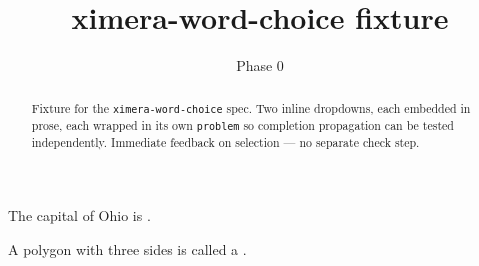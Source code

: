 \documentclass{ximera}
\title{ximera-word-choice fixture}
\author{Phase 0}
\begin{document}
\begin{abstract}
Fixture for the \texttt{ximera-word-choice} spec. Two inline dropdowns, each embedded in prose, each wrapped in its own \texttt{problem} so completion propagation can be tested independently. Immediate feedback on selection --- no separate check step.
\end{abstract}

\maketitle

\begin{problem}
  The capital of Ohio is .
\end{problem}

\begin{problem}
  A polygon with three sides is called a .
\end{problem}
\end{document}
